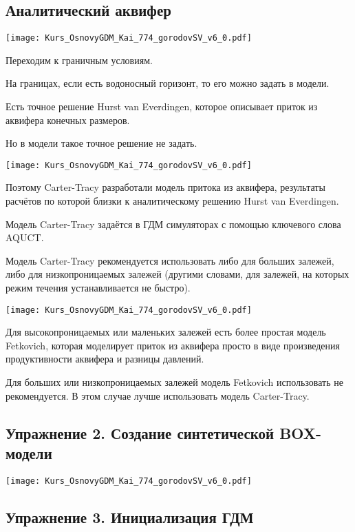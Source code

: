 \documentclass[main.tex]{subfiles}
\begin{document}
\subsection{Аналитический аквифер}

\texttt{[image: Kurs\_OsnovyGDM\_Kai\_774\_gorodovSV\_v6\_0.pdf]}

Переходим к граничным условиям.

На границах, если есть водоносный горизонт, то его можно задать в модели.

Есть точное решение Hurst van Everdingen, которое описывает приток из аквифера конечных размеров.

Но в модели такое точное решение не задать.

\texttt{[image: Kurs\_OsnovyGDM\_Kai\_774\_gorodovSV\_v6\_0.pdf]}

Поэтому Carter-Tracy разработали модель притока из аквифера, результаты расчётов по которой близки к аналитическому решению Hurst van Everdingen.

Модель Carter-Tracy задаётся в ГДМ симуляторах с помощью ключевого слова AQUCT.

Модель Carter-Tracy рекомендуется использовать либо для больших залежей, либо для низкопроницаемых залежей (другими словами, для залежей, на которых режим течения устанавливается не быстро).

\texttt{[image: Kurs\_OsnovyGDM\_Kai\_774\_gorodovSV\_v6\_0.pdf]}

Для высокопроницаемых или маленьких залежей есть более простая модель Fetkovich, которая моделирует приток из аквифера просто в виде произведения продуктивности аквифера и разницы давлений.

Для больших или низкопроницаемых залежей модель Fetkovich использовать не рекомендуется. В этом случае лучше использовать модель Carter-Tracy.

\subsection{Упражнение 2. Создание синтетической BOX-модели}

\texttt{[image: Kurs\_OsnovyGDM\_Kai\_774\_gorodovSV\_v6\_0.pdf]}

\subsection{Упражнение 3. Инициализация ГДМ}
\end{document}
